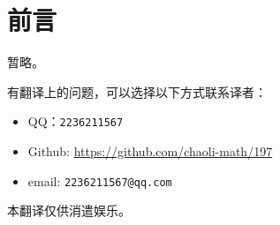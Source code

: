 \chapter*{前言}
暂略。

\vspace{2ex}

有翻译上的问题，可以选择以下方式联系译者：

\begin{itemize}
    \item QQ：{\tt 2236211567}
    \item Github: \url{https://github.com/chaoli-math/197}
    \item email: {\tt 2236211567@qq.com}
\end{itemize}

本翻译仅供消遣娱乐。